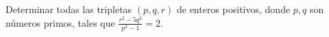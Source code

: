Determinar todas las tripletas $(p, q, r)$ de enteros positivos, donde $p, q$ son números primos, tales que $\frac{r^2-5q^2}{p^2-1}=2$.
